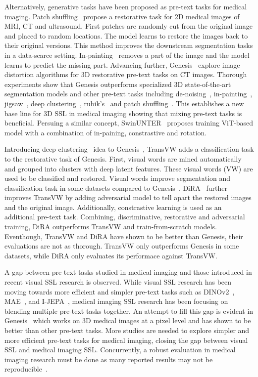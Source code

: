\documentclass[a4paper,11pt,oneside]{report}
\begin{document}
Alternatively, generative tasks have been proposed as pre-text tasks for medical imaging. Patch shuffling~\cite{Chen2019} propose a restorative task for 2D medical images of MRI, CT and ultrasound. First patches are randomly cut from the original image and placed to random locations. The model learns to restore the images back to their original versions. This method improves the downstream segmentation tasks in a data-scarce setting. In-painting~\cite{Pathak2016} removes a part of the image and the model learns to predict the missing part. Advancing further, Genesis~\cite{Zhou2021} explore image distortion algorithms for 3D restorative pre-text tasks on CT images. Thorough experiments show that Genesis outperforms specialized 3D state-of-the-art segmentation models and other pre-text tasks including de-noising~\cite{Vincent2010}, in-painting~\cite{Pathak2016}, jigsaw~\cite{Noroozi2016}, deep clustering~\cite{Caron2018}, rubik's~\cite{Zhuang2019} and patch shuffling~\cite{Chen2019}. This establishes a new base line for 3D SSL in medical imaging showing that mixing pre-text tasks is beneficial. Persuing a similar concept, SwinUNTER~\cite{Tang2022} proposes training ViT-based model with a combination of in-paining, constrastive and rotation.

Introducing deep clustering~\cite{Caron2018} idea to Genesis~\cite{Zhou2021}, TransVW adds a classification task to the restorative task of Genesis. First, visual words are mined automatically and grouped into clusters with deep latent features. These visual words (VW) are used to be classified and restored. Visual words improve segmentation and classification task in some datasets compared to Genesis~\cite{Haghighi2021}. DiRA~\cite{Haghighi2024} further improves TransVW by adding adversarial model to tell apart the restored images and the original image. Additionally, constrastive learning is used as an additional pre-text task. Combining, discriminative, restorative and adversarial training, DiRA outperforms TransVW and train-from-scratch models. Eventhough, TransVW and DiRA have shown to be better than Genesis, their evaluations are not as thorough. TransVW only outperforms Genesis in some datasets, while DiRA only evaluates its performace against TransVW.

A gap between pre-text tasks studied in medical imaging and those introduced in recent visual SSL research is observed. While visual SSL research has been moving towards more efficient and simpler pre-text tasks such as DINOv2~\cite{Oquab2024dinov}, MAE~\cite{He2022}, and I-JEPA~\cite{Assran2023}, medical imaging SSL research has been focusing on blending multiple pre-text tasks together. An attempt to fill this gap is evident in Genesis~\cite{Zhou2021} which works on 3D medical images at a pixel level and has shown to be better than other pre-text tasks. More studies are needed to explore simpler and more efficient pre-text tasks for medical imaging, closing the gap between visual SSL and medical imaging SSL. Concurrently, a robust evaluation in medical imaging research must be done as many reported results may not be reproducible~\cite{Isensee2024}.
\end{document}
